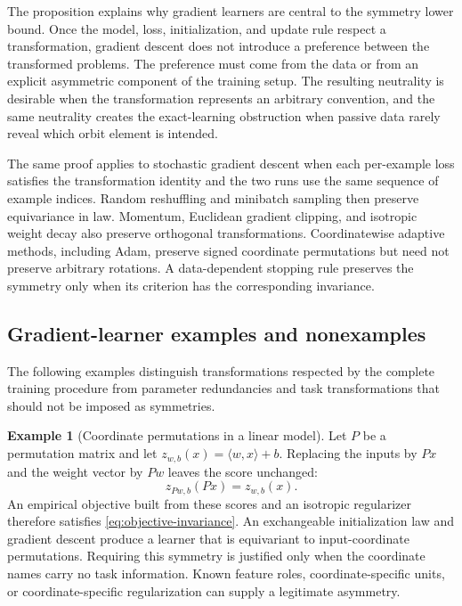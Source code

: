 \documentclass[11pt,twoside]{article}
\theoremstyle{definition}
\newtheorem{example}[theorem]{Example}
\theoremstyle{remark}
\begin{document}
The proposition explains why gradient learners are central to the symmetry
lower bound. Once the model, loss, initialization, and update rule respect a
transformation, gradient descent does not introduce a preference between the
transformed problems. The preference must come from the data or from an
explicit asymmetric component of the training setup. The resulting neutrality
is desirable when the transformation represents an arbitrary convention, and
the same neutrality creates the exact-learning obstruction when passive data
rarely reveal which orbit element is intended.

The same proof applies to stochastic gradient descent when each per-example
loss satisfies the transformation identity and the two runs use the same
sequence of example indices. Random reshuffling and minibatch sampling then
preserve equivariance in law. Momentum, Euclidean gradient clipping, and
isotropic weight decay also preserve orthogonal transformations. Coordinatewise
adaptive methods, including Adam, preserve signed coordinate permutations but
need not preserve arbitrary rotations. A data-dependent stopping rule preserves
the symmetry only when its criterion has the corresponding invariance.

\subsection{Gradient-learner examples and nonexamples}
\label{sec:symmetry-examples}

The following examples distinguish transformations respected by the complete
training procedure from parameter redundancies and task transformations that
should not be imposed as symmetries.

\begin{example}[Coordinate permutations in a linear model]
Let \(P\) be a permutation matrix and let
\(z_{w,b}(x)=\langle w,x\rangle+b\). Replacing the inputs by \(Px\) and the
weight vector by \(Pw\) leaves the score unchanged:
\[
 z_{Pw,b}(Px)=z_{w,b}(x).
\]
An empirical objective built from these scores and an isotropic regularizer
therefore satisfies \cref{eq:objective-invariance}. An exchangeable
initialization law and gradient descent produce a learner that is equivariant
to input-coordinate permutations. Requiring this symmetry is justified only
when the coordinate names carry no task information. Known feature roles,
coordinate-specific units, or coordinate-specific regularization can supply a
legitimate asymmetry.
\end{example}
\end{document}
